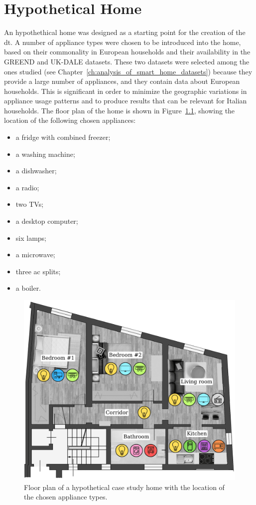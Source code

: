 \chapter{Hypothetical Home}\label{ch:hypothetical_home}

An hypothethical home was designed as a starting point for the creation of the \acrshort{dt}. A number of appliance types were chosen to be introduced into the home, based on their commonality in European households and their availability in the GREEND and UK-DALE datasets. These two datasets were selected among the ones studied (see Chapter~\ref{ch:analysis_of_smart_home_datasets}) because they provide a large number of appliances, and they contain data about European households. This is significant in order to minimize the geographic variations in appliance usage patterns and to produce results that can be relevant for Italian households. The floor plan of the home is shown in Figure~\ref{fig:home_floor_plan}, showing the location of the following chosen appliances:
\begin{itemize}
    \item a fridge with combined freezer;
    \item a washing machine;
    \item a dishwasher;
    \item a radio;
    \item two TVs;
    \item a desktop computer;
    \item six lamps;
    \item a microwave;
    \item three \acrshort{ac} splits;
    \item a boiler.
\end{itemize}

\begin{figure}
    \centering
    \includegraphics[width=0.75\linewidth]{images/floor_plan.png}
    \caption{Floor plan of a hypothetical case study home with the location of the chosen appliance types.}
    \label{fig:home_floor_plan}
\end{figure}

